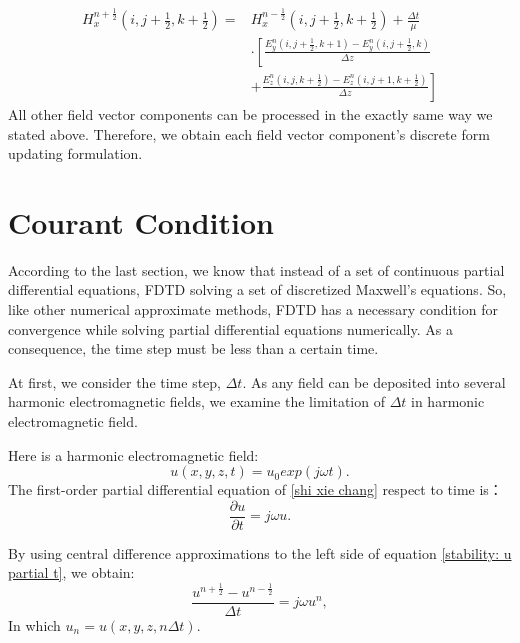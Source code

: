 \begin{equation}\label{ch2 eq:hx discrete simple}
\begin{split}
H^{n+\frac{1}{2}}_{x}\left( i,j+\frac{1}{2},k+\frac{1}{2} \right)=&H^{n-\frac{1}{2}}_{x}\left( i,j+\frac{1}{2},k+\frac{1}{2} \right)+\frac{\Delta t}{\mu}\\
{}&\cdot\left[
\frac{
	E^n_y\left(i,j+\frac{1}{2},k+1\right)-E^n_y\left(i,j+\frac{1}{2},k\right)
	}{\Delta z}\right.\\
{}&+\left.
\frac{
	E^n_z\left(i,j,k+\frac{1}{2}\right)-E^n_z\left(i,j+1,k+\frac{1}{2}\right)
}{\Delta z}
\right]
\end{split}
\end{equation}
All other field vector components can be processed in the exactly same way we stated above. Therefore, we obtain each field vector component's discrete form updating formulation.

\section{Courant Condition}
According to the last section, we know that instead of a set of continuous partial differential equations, FDTD solving a set of discretized Maxwell's equations. So, like other numerical approximate methods, FDTD has a necessary condition for convergence while solving partial differential equations numerically. As a consequence, the time step must be less than a certain time.

At first, we consider the time step, $\Delta t$. As any field can be deposited into several harmonic electromagnetic fields, we examine the limitation of $\Delta t$ in harmonic electromagnetic field.

Here is a harmonic electromagnetic field:
\begin{equation}\label{stability: shi xie chang}
u(x,y,z,t)=u_0exp(j\omega t).
\end{equation}
The first-order partial differential equation of \eqref{shi xie chang} respect to time is：
\begin{equation}\label{stability: u partial t}
\frac{\partial u}{\partial t}=j\omega u.
\end{equation}

By using central difference approximations to the left side of equation \eqref{stability: u partial t}, we obtain:
\begin{equation}\label{stability: chafen}
\frac{u^{n+\frac{1}{2}}-u^{n-\frac{1}{2}}}{\Delta t}=j\omega u^n,
\end{equation}
In which $u_n=u(x,y,z,n\Delta t)$.

